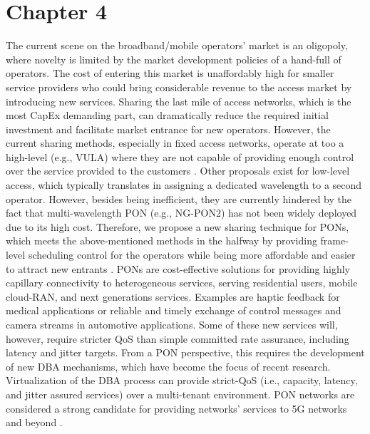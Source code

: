 \acresetall
\chapter*{Chapter 4}

The current scene on the broadband/mobile operators' market is an oligopoly, where novelty is limited by the market development policies of a hand-full of operators. The cost of entering this market is unaffordably high for smaller service providers who could bring considerable revenue to the access market by introducing new services. Sharing the last mile of access networks, which is the most \ac{CapEx} demanding part, can dramatically reduce the required initial investment and facilitate market entrance for new operators. However, the current sharing methods, especially in fixed access networks, operate at too a high-level (e.g., \ac{VULA}) where they are not capable of providing enough control over the service provided to the customers \cite{7592399}. Other proposals exist for low-level access, which typically translates in assigning a dedicated wavelength to a second operator. However, besides being inefficient, they are currently hindered by the fact that multi-wavelength \ac{PON} (e.g., \ac{NG-PON2}) has not been widely deployed due to its high cost. Therefore, we propose a new sharing technique for \acp{PON}, which meets the above-mentioned methods in the halfway by providing frame-level scheduling control for the operators while being more affordable and easier to attract new entrants \cite{7936877}.
 \acp{PON} are cost-effective solutions for providing highly capillary connectivity to heterogeneous services, serving residential users, mobile cloud-RAN, and next generations services. Examples are haptic feedback for medical applications or reliable and timely exchange of control messages and camera streams in automotive applications. Some of these new services will, however, require stricter \ac{QoS} than simple committed rate assurance, including latency and jitter targets. From a \ac{PON} perspective, this requires the development of new \ac{DBA} mechanisms, which have become the focus of recent research. Virtualization of the \ac{DBA} process can provide strict-\ac{QoS} (i.e., capacity, latency, and jitter assured services) over a multi-tenant environment. \ac{PON} networks are considered a strong candidate for providing networks' services to 5G networks and beyond \cite{8412589}. 
 
